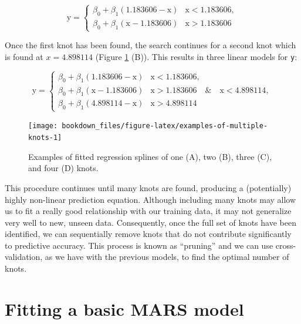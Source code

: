\documentclass[]{krantz}
\begin{document}
\begin{equation}
\label{eq:hinge}
  \text{y} = 
  \begin{cases}
    \beta_0 + \beta_1(1.183606 - \text{x}) & \text{x} < 1.183606, \\
    \beta_0 + \beta_1(\text{x} - 1.183606) & \text{x} > 1.183606
  \end{cases}
\end{equation}

Once the first knot has been found, the search continues for a second knot which is found at \(x = 4.898114\) (Figure \ref{fig:examples-of-multiple-knots} (B)). This results in three linear models for \texttt{y}:

\begin{equation}
\label{eq:hinge2}
  \text{y} = 
  \begin{cases}
    \beta_0 + \beta_1(1.183606 - \text{x}) & \text{x} < 1.183606, \\
    \beta_0 + \beta_1(\text{x} - 1.183606) & \text{x} > 1.183606 \quad \& \quad \text{x} < 4.898114, \\
    \beta_0 + \beta_1(4.898114 - \text{x}) & \text{x} > 4.898114
  \end{cases}
\end{equation}

\begin{figure}

{\centering \texttt{[image: bookdown\_files/figure-latex/examples-of-multiple-knots-1]} 

}

\caption{Examples of fitted regression splines of one (A), two (B), three (C), and four (D) knots.}\label{fig:examples-of-multiple-knots}
\end{figure}

This procedure continues until many knots are found, producing a (potentially) highly non-linear prediction equation. Although including many knots may allow us to fit a really good relationship with our training data, it may not generalize very well to new, unseen data. Consequently, once the full set of knots have been identified, we can sequentially remove knots that do not contribute significantly to predictive accuracy. This process is known as ``pruning'' and we can use cross-validation, as we have with the previous models, to find the optimal number of knots.

\hypertarget{fitting-a-basic-mars-model}{%
\section{Fitting a basic MARS model}\label{fitting-a-basic-mars-model}}
\end{document}
